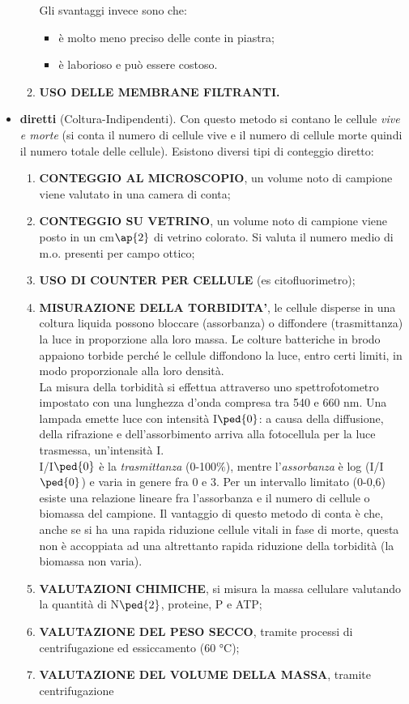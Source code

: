 \documentclass[11pt]{book}
\begin{document}
\begin{itemize}
\begin{enumerate}
Gli svantaggi invece sono che:
\begin{itemize}
\item è molto meno preciso delle conte in piastra;
\item  è laborioso e può essere costoso.
\end{itemize}

\item \textbf{USO DELLE MEMBRANE FILTRANTI.}
\end{enumerate}


\item \textbf{diretti} (Coltura-Indipendenti). Con questo metodo si contano le cellule \emph{vive e morte} (si conta il numero di cellule vive e il numero di cellule morte quindi il numero totale delle cellule). Esistono diversi tipi di conteggio diretto:
\begin{enumerate} 
\item \textbf{CONTEGGIO AL MICROSCOPIO}, un volume noto di campione viene valutato in una camera di conta;
\item \textbf{CONTEGGIO SU VETRINO}, un volume noto di campione viene posto in un cm$\ap{2}$ di vetrino colorato. Si valuta il numero medio di m.o. presenti per campo ottico;
\item \textbf{USO DI COUNTER PER CELLULE} (es citofluorimetro);
\item \textbf{MISURAZIONE DELLA TORBIDITA’}, le cellule disperse in una coltura liquida possono bloccare (assorbanza) o diffondere (trasmittanza) la luce in proporzione alla loro massa. Le colture batteriche in brodo appaiono torbide perché le cellule diffondono la luce, entro certi limiti, in modo proporzionale alla loro densità.\\
La misura della torbidità si effettua attraverso uno spettrofotometro impostato con una lunghezza d’onda compresa tra 540 e 660 nm.
Una lampada emette luce con intensità I$\ped{0}$: a causa della diffusione, della rifrazione e dell’assorbimento arriva alla fotocellula per la luce trasmessa, un’intensità I.\\
I/I$\ped{0}$ è la \emph{trasmittanza} (0-100$\%$), mentre l’\emph{assorbanza} è log (I/I$\ped{0}$) e varia in genere fra 0 e 3. Per un intervallo limitato (0-0,6) esiste una relazione lineare fra l'assorbanza e il numero di cellule o biomassa del campione.
Il vantaggio di questo metodo di conta è che, anche se si ha una rapida riduzione cellule vitali in fase di morte, questa non è accoppiata ad una altrettanto rapida riduzione della torbidità (la biomassa non varia).
\item \textbf{VALUTAZIONI CHIMICHE}, si misura la massa cellulare valutando la quantità di N$\ped{2}$, proteine, P e ATP;
\item \textbf{VALUTAZIONE DEL PESO SECCO}, tramite processi di centrifugazione ed essiccamento (60 °C);
\item \textbf{VALUTAZIONE DEL VOLUME DELLA MASSA}, tramite centrifugazione
\end{enumerate}

\end{itemize}
\end{document}

